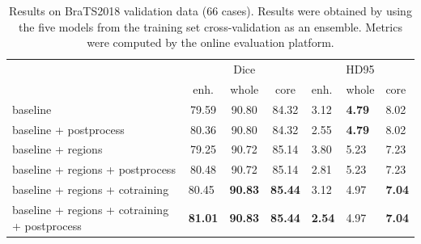 \documentclass{templates/llncs} %
\begin{document}
\begin{table}[]
\caption{Results on BraTS2018 validation data (66 cases). Results were obtained by using the five models from the training set cross-validation as an ensemble. Metrics were computed by the online evaluation platform.}
\begin{tabular}{lccclll}
    & \multicolumn{3}{c}{Dice}     & \multicolumn{3}{c}{HD95}  \\
\multicolumn{1}{c}{}    & enh.  & whole & core  & enh. & whole   & core \\
\hline
baseline     & 79.59 & 90.80 & 84.32 & 3.12 & \textbf{4.79} & 8.02 \\
baseline + postprocess     & 80.36 & 90.80 & 84.32 & 2.55 & \textbf{4.79} & 8.02 \\
baseline + regions    & 79.25 & 90.72 & 85.14 & 3.80 & 5.23 & 7.23 \\
baseline + regions + postprocess & 80.48 & 90.72 & 85.14 & 2.81 & 5.23 & 7.23 \\
baseline + regions + cotraining  & \multicolumn{1}{l}{80.45} & \multicolumn{1}{l}{\textbf{90.83}} & \multicolumn{1}{l}{\textbf{85.44}} & 3.12 & 4.97 & \textbf{7.04} \\
baseline + regions + cotraining + postprocess & \multicolumn{1}{l}{\textbf{81.01}} & \multicolumn{1}{l}{\textbf{90.83}} & \multicolumn{1}{l}{\textbf{85.44}} & \textbf{2.54} & 4.97 & \textbf{7.04}
\end{tabular}
\label{tab:val}
\end{table}
\end{document}
